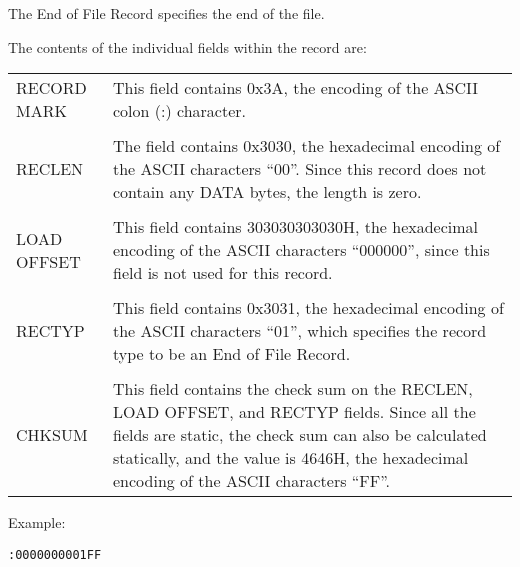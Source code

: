 The End of File Record specifies the end of the file.

The contents of the individual fields within the record are:

\begin{tabular}{l p{10cm}}
RECORD MARK & This field contains 0x3A, the encoding of the ASCII colon (:) character. \\
& \\
RECLEN & The field contains 0x3030, the hexadecimal encoding of the ASCII characters ``00''. Since this record does not contain any DATA bytes, the length is zero. \\
& \\
LOAD OFFSET & This field contains 303030303030H, the hexadecimal encoding of the ASCII characters ``000000'', since this field is not used for this record. \\
& \\
RECTYP & This field contains 0x3031, the hexadecimal encoding of the ASCII characters ``01'', which specifies the record type to be an End of File Record. \\
& \\
CHKSUM & This field contains the check sum on the RECLEN, LOAD OFFSET, and RECTYP fields. Since all the fields are static, the check sum can also be calculated statically, and the value is 4646H, the hexadecimal encoding of the ASCII characters ``FF''. \\
\end{tabular}

Example:

\begin{verbatim}
:0000000001FF
\end{verbatim}

